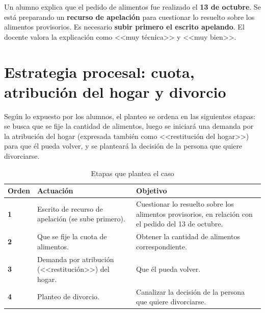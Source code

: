 \documentclass[12pt,oneside]{book}
\begin{document}
Un alumno explica que el pedido de alimentos fue realizado el \textbf{13 de octubre}. Se está preparando un \textbf{recurso de apelación} para cuestionar lo resuelto sobre los alimentos provisorios. Es necesario \textbf{subir primero el escrito apelando}. El docente valora la explicación como <<muy técnica>> y <<muy bien>>.


\section{Estrategia procesal: cuota, atribución del hogar y divorcio}

Según lo expuesto por los alumnos, el planteo se ordena en las siguientes etapas: se busca que se fije la cantidad de alimentos, luego se iniciará una demanda por la atribución del hogar (expresada también como <<restitución del hogar>>) para que él pueda volver, y se planteará la decisión de la persona que quiere divorciarse.


\begin{table}[H]
\centering
\caption{Etapas que plantea el caso}
\begin{tabularx}{\textwidth}{
    >{\centering\arraybackslash}p{}
    >{\raggedright\arraybackslash}X
    >{\raggedright\arraybackslash}X
}
\toprule
\textbf{Orden} & \textbf{Actuación} & \textbf{Objetivo} \\
\midrule
\textbf{1} &
Escrito de recurso de apelación (se sube primero). &
Cuestionar lo resuelto sobre los alimentos provisorios, en relación con el pedido del 13 de octubre. \\
\addlinespace
\textbf{2} &
Que se fije la cuota de alimentos. &
Obtener la cantidad de alimentos correspondiente. \\
\addlinespace
\textbf{3} &
Demanda por atribución (<<restitución>>) del hogar. &
Que él pueda volver. \\
\addlinespace
\textbf{4} &
Planteo de divorcio. &
Canalizar la decisión de la persona que quiere divorciarse. \\
\bottomrule
\end{tabularx}
\end{table}
\end{document}
